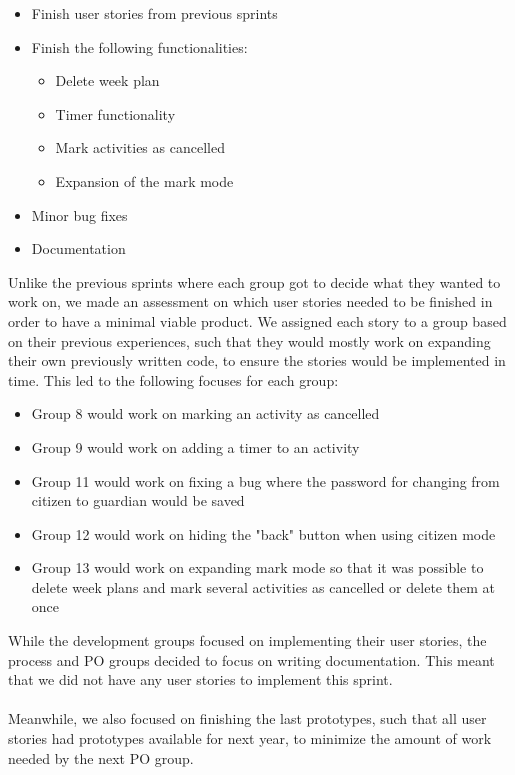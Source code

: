 \begin{itemize}
    \item Finish user stories from previous sprints
    \item Finish the following functionalities: 
    \begin{itemize}
        \item Delete week plan
        \item Timer functionality
        \item Mark activities as cancelled
        \item Expansion of the mark mode
    \end{itemize}
    \item Minor bug fixes
    \item Documentation
\end{itemize}
\noindent
Unlike the previous sprints where each group got to decide what they wanted to work on, we made an assessment on which user stories needed to be finished in order to have a minimal viable product. 
We assigned each story to a group based on their previous experiences, such that they would mostly work on expanding their own previously written code, to ensure the stories would be implemented in time.
This led to the following focuses for each group:
\begin{itemize}
    \item Group 8 would work on marking an activity as cancelled
    \item Group 9 would work on adding a timer to an activity
    \item Group 11 would work on fixing a bug where the password for changing from citizen to guardian would be saved
    \item Group 12 would work on hiding the "back" button when using citizen mode
    \item Group 13 would work on expanding mark mode so that it was possible to delete week plans and mark several activities as cancelled or delete them at once
\end{itemize}
While the development groups focused on implementing their user stories, the process and PO groups decided to focus on writing documentation.
This meant that we did not have any user stories to implement this sprint.
\\\\
Meanwhile, we also focused on finishing the last prototypes, such that all user stories had prototypes available for next year, to minimize the amount of work needed by the next PO group.

